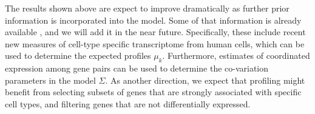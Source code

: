 \documentclass{article} %
\begin{document}
The results shown above are expect to improve dramatically as further prior information is incorporated into the model. Some of that information is already available \cite{darmanis2015survey}, and we will add it in the near future.  Specifically, these include recent new measures of cell-type specific transcriptome from human cells, which can be used to determine the expected profiles $\mu_k$. Furthermore, estimates of coordinated expression among gene pairs can be used to determine the co-variation parameters in the model $\Sigma$.
As another direction, we expect that profiling might benefit from selecting subsets of genes that are strongly associated with specific cell types, and filtering genes that are not differentially expressed.

\newpage

\end{document}
